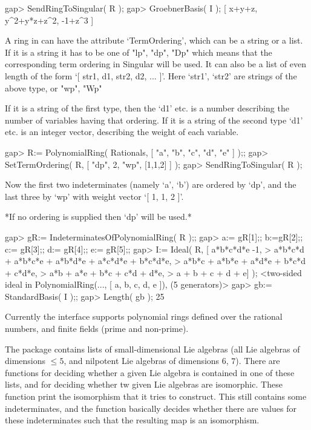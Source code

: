 \beginexample
gap> SendRingToSingular( R );
gap> GroebnerBasis( I );
[ x+y+z, y^2+y*z+z^2, -1+z^3 ]
\endexample


A ring in {\GAP} can have the attribute `TermOrdering', which can be
a string or a list. If it is a string it has to be one of 
\begintt 
"lp", "dp", "Dp" 
\endtt
which means that the corresponding term ordering in {\sf Singular} will be 
used. It can also be a list of even length of the form 
`[ str1, d1, str2, d2, ... ]'. Here `str1', `str2' are strings of the above 
type, or 
\begintt
"wp", "Wp"
\endtt

If it is a string of the first type, then the `d1' etc. is a number
describing the number of variables having that ordering. If it is a string
of the second type `d1' etc. is an integer vector, describing the weight
of each variable.

\beginexample
gap> R:= PolynomialRing( Rationals, [ "a", "b", "c", "d", "e" ] );;
gap> SetTermOrdering( R, [ "dp", 2, "wp", [1,1,2] ] );
gap> SendRingToSingular( R );
\endexample

Now the first two indeterminates (namely `a', `b') are ordered 
by `dp', and the last three by `wp' with weight vector `[ 1, 1, 2 ]'.

*If no ordering is supplied then `dp' will be used.*

\beginexample
gap> gR:= IndeterminatesOfPolynomialRing( R );;
gap> a:= gR[1];; b:=gR[2];; c:= gR[3];; d:= gR[4];; e:= gR[5];;
gap> I:= Ideal( R, [ a*b*c*d*e -1,
> a*b*c*d + a*b*c*e + a*b*d*e + a*c*d*e + b*c*d*e,             
> a*b*c + a*b*e + a*d*e + b*c*d + c*d*e,                       
>  a*b + a*e + b*c + c*d + d*e,                                
> a + b + c + d + e] );                                        
<two-sided ideal in PolynomialRing(..., [ a, b, c, d, e ]), (5 generators)>
gap> gb:= StandardBasis( I );;
gap> Length( gb );
25
\endexample




Currently the interface supports polynomial rings defined over
the rational numbers, and finite fields (prime and non-prime).


The package contains lists of small-dimensional Lie algebras (all Lie
algebras of dimensions $\leq 5$, and nilpotent Lie algebras of dimensions
$6$, $7$). There are functions for deciding whether a given Lie algebra
is contained in one of these lists, and for deciding whether tw given Lie
algebras are isomorphic. These function print the isomorphism that it tries
to construct. This still contains some indeterminates, and the function
basically decides whether there are values for these indeterminates such
that the resulting map is an isomorphism.

